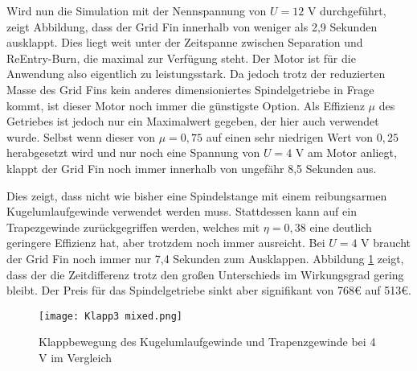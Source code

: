 Wird nun die Simulation mit der Nennspannung von $U = 12$ V durchgeführt, zeigt Abbildung, dass der Grid Fin innerhalb von weniger als 2,9 Sekunden ausklappt. Dies liegt weit unter der Zeitspanne zwischen Separation und ReEntry-Burn, die maximal zur Verfügung steht. Der Motor ist für die Anwendung also eigentlich zu leistungsstark. Da jedoch trotz der reduzierten Masse des Grid Fins kein anderes dimensioniertes Spindelgetriebe in Frage kommt, ist dieser Motor noch immer die günstigste Option.
Als Effizienz $\mu$ des Getriebes ist jedoch nur ein Maximalwert gegeben, der hier auch verwendet wurde. Selbst wenn dieser von $\mu = 0,75$ auf einen sehr niedrigen Wert von $0,25$ herabgesetzt wird und nur noch eine Spannung von $U = 4$ V am Motor anliegt, klappt der Grid Fin noch immer innerhalb von ungefähr 8,5 Sekunden aus.

Dies zeigt, dass nicht wie bisher eine Spindelstange mit einem reibungsarmen Kugelumlaufgewinde verwendet werden muss. Stattdessen kann auf ein Trapezgewinde zurückgegriffen werden, welches mit $\eta  = 0,38$ eine deutlich geringere Effizienz hat, aber trotzdem noch immer ausreicht. Bei $U = 4$ V braucht der Grid Fin noch immer nur 7,4 Sekunden zum Ausklappen. Abbildung \ref{abb_klappKG} zeigt, dass der die Zeitdifferenz trotz den großen Unterschieds im Wirkungsgrad gering bleibt. Der Preis für das Spindelgetriebe sinkt aber signifikant von 768€ auf 513€.
\begin{figure}[h] 
	\centering
	\texttt{[image: Klapp3 mixed.png]}
	\caption{Klappbewegung des Kugelumlaufgewinde und Trapenzgewinde bei 4 V im Vergleich}
	\label{abb_klappKG}
\end{figure}
